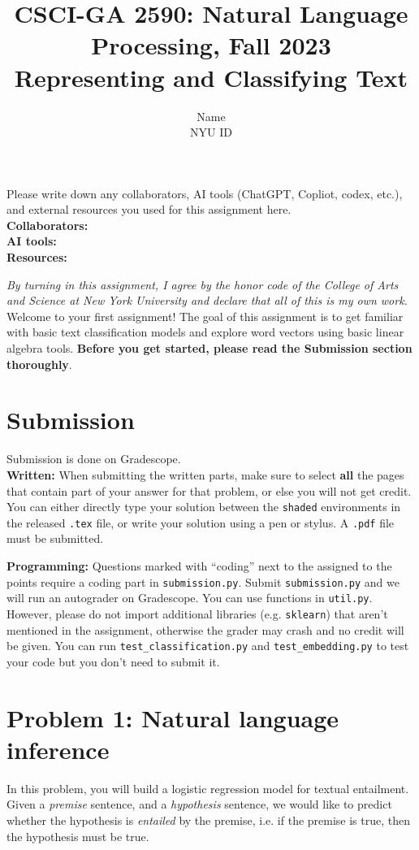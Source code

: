 \documentclass{article}
\title{\textbf{CSCI-GA 2590: Natural Language Processing, Fall 2023} \\Representing and Classifying Text}
\author{Name \\
NYU ID}
\date{}
\theoremstyle{case}
\theoremstyle{definition}
\begin{document}
\maketitle
\begin{tcolorbox}
Please write down any collaborators, AI tools (ChatGPT, Copliot, codex, etc.), and external resources you used for this assignment here. \\
\textbf{Collaborators:} \\
\textbf{AI tools:} \\
\textbf{Resources:} 
\end{tcolorbox}
\textit{By turning in this assignment, I agree by the honor code of the College of Arts and Science at New York University and declare
that all of this is my own work.} \\


Welcome to your first assignment! The goal of this assignment is to get familiar with basic text classification models and explore word vectors using basic linear algebra tools.
\textbf{Before you get started, please read the Submission section thoroughly}.

\section*{Submission}
Submission is done on Gradescope. \\

\textbf{Written:} When submitting the written parts, make sure to select \textbf{all} the pages that contain part of your answer for that problem, or else you will not get credit.
You can either directly type your solution between the \texttt{shaded} environments in the released \texttt{.tex} file,
or write your solution using a pen or stylus. 
A \texttt{.pdf} file must be submitted.

\textbf{Programming:} Questions marked with ``coding'' next to the assigned to the points require a coding part in \texttt{submission.py}.
Submit \texttt{submission.py} and we will run an autograder on Gradescope. You can use functions in \texttt{util.py}. However, please do not import additional libraries (e.g. \texttt{sklearn}) that aren't mentioned in the assignment, otherwise the grader may crash and no credit will be given.
You can run \texttt{test\_classification.py} and \texttt{test\_embedding.py} to test your code but you don't need to submit it.


\section*{Problem 1: Natural language inference}
In this problem, you will build a logistic regression model for textual entailment.
Given a \textit{premise} sentence,
and a \textit{hypothesis} sentence,
we would like to predict whether the hypothesis is \textit{entailed} by the premise,
i.e. if the premise is true, then the hypothesis must be true.
\end{document}
